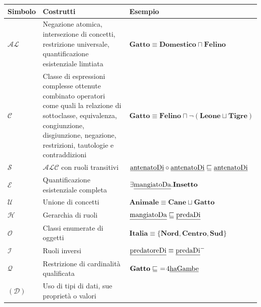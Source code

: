 \documentclass{article}
\begin{document}
\begin{table}[h!t] 
    \centering
    \label{tab:fragments_DL}
    \caption{Alcuni simboli di DL con associati i costrutti caratteristici.}
    \begin{longtable}{p{}p{}p{}}
        \textbf{Simbolo} & \textbf{Costrutti} & \textbf{Esempio}  \\
        \hline
        $\mathcal{AL}$ & 
        Negazione atomica, intersezione di concetti, restrizione universale, quantificazione esistenziale limtiata & 
        $ \textbf{Gatto} \equiv \textbf{Domestico} \sqcap \textbf{Felino} $ \\
        \hline
        $\mathcal{C}$ & 
        Classe di espressioni complesse ottenute combinato operatori come quali la relazione di sottoclasse, equivalenza, congiunzione, disgiunzione, negazione, restrizioni, tautologie e contraddizioni & 
        $ \textbf{Gatto} \equiv \textbf{Felino} \sqcap \neg (\textbf{Leone} \sqcup \textbf{Tigre}) $ \\
        \hline
        $\mathcal{S}$ & $ \mathcal{ALC} $ con ruoli transitivi &
        $ \textrm{\underline{antenatoDi}} \circ \textrm{\underline{antenatoDi}} \sqsubseteq \textrm{\underline{antenatoDi}} $ \\
        \hline
        $\mathcal{E}$ & Quantificazione esistenziale completa & 
        $ \exists \textrm{\underline{mangiatoDa}}.\textbf{Insetto} $ \\
        \hline
        $\mathcal{U}$ & Unione di concetti & $ \textbf{Animale} \equiv \textbf{Cane} \sqcup \textbf{Gatto} $ \\
        \hline
        $\mathcal{H}$ & Gerarchia di ruoli & $ \textrm{\underline{mangiatoDa}} \sqsubseteq \textrm{\underline{predaDi}} $ \\
        \hline
        $\mathcal{O}$ & Classi enumerate di oggetti & $ \textbf{Italia} \equiv \{ \textbf{Nord}, \textbf{Centro}, \textbf{Sud} \} $ \\
        \hline
        $\mathcal{I}$ & Ruoli inversi & $ \textrm{\underline{predatoreDi}} \equiv \textrm{\underline{predaDi}}^{-} $ \\
        \hline
        $\mathcal{Q}$ & Restrizione di cardinalità qualificata & $ \textbf{Gatto} \sqsubseteq  \ = \! 4\textrm{\underline{haGambe}} $ \\
        \hline
        $\mathcal{(D)}$ & Uso di tipi di dati, sue proprietà o valori &  \\
        \hline
    \end{longtable}
\end{table}
\end{document}
